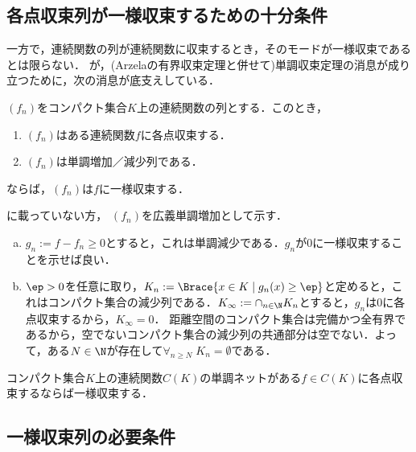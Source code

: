 \documentclass[uplatex, dvipdfmx]{jsreport}
\begin{document}
\subsection{各点収束列が一様収束するための十分条件}

\begin{tcolorbox}[colframe=ForestGreen, colback=ForestGreen!10!white,breakable,colbacktitle=ForestGreen!40!white,coltitle=black,fonttitle=\bfseries\sffamily,
title=]
    一方で，連続関数の列が連続関数に収束するとき，そのモードが一様収束であるとは限らない．
    が，(Arzelaの有界収束定理と併せて)単調収束定理の消息が成り立つために，次の消息が底支えしている．
\end{tcolorbox}

\begin{theorem}\label{thm-for-pointwise-to-be-uniform}
    $(f_n)$をコンパクト集合$K$上の連続関数の列とする．このとき，
    \begin{enumerate}
        \item $(f_n)$はある連続関数$f$に各点収束する．
        \item $(f_n)$は単調増加／減少列である．
    \end{enumerate}
    ならば，$(f_n)$は$f$に一様収束する．
\end{theorem}
\begin{Proof}
    \cite{Principles of Mathematical Analysis}に載っていない方，
    $(f_n)$を広義単調増加として示す．
    \begin{enumerate}[(a)]
        \item $g_n:=f-f_n\ge0$とすると，これは単調減少である．$g_n$が$0$に一様収束することを示せば良い．
        \item $\ep>0$を任意に取り，$K_n:=\Brace{x\in K\mid g_n(x)\ge\ep}$と定めると，これはコンパクト集合の減少列である．$K_\infty:=\cap_{n\in\N}K_n$とすると，$g_n$は$0$に各点収束するから，$K_\infty=0$．
        距離空間のコンパクト集合は完備かつ全有界であるから，空でないコンパクト集合の減少列の共通部分は空でない．よって，ある$N\in\N$が存在して$\forall_{n\ge N}\;K_n=\emptyset$である．
    \end{enumerate}
\end{Proof}

\begin{corollary}
    コンパクト集合$K$上の連続関数$C(K)$の単調ネットがある$f\in C(K)$に各点収束するならば一様収束する．
\end{corollary}

\subsection{一様収束列の必要条件}
\end{document}
